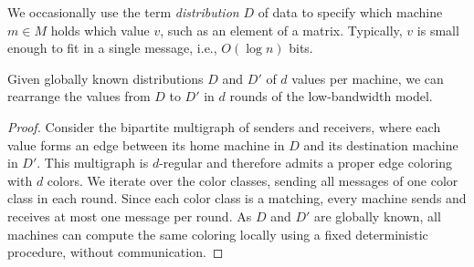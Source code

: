 We occasionally use the term \emph{distribution} $D$ of data to specify which machine $m\in M$ holds which value $v$, such as an element of a matrix. Typically, $v$ is small enough to fit in a single message, i.e., $O(\log n)$ bits.

\begin{lemma}\label{lem:redistribution-offline}
	Given globally known distributions $D$ and $D'$ of $d$ values per machine, we can rearrange the values from $D$ to $D'$ in $d$ rounds of the low-bandwidth model.
\end{lemma}
\begin{proof}
	Consider the bipartite multigraph of senders and receivers, where each value forms an edge between its home machine in $D$ and its destination machine in $D'$. This multigraph is $d$-regular and therefore admits a proper edge coloring with $d$ colors. We iterate over the color classes, sending all messages of one color class in each round. Since each color class is a matching, every machine sends and receives at most one message per round. As $D$ and $D'$ are globally known, all machines can compute the same coloring locally using a fixed deterministic procedure, without communication.
\end{proof}



